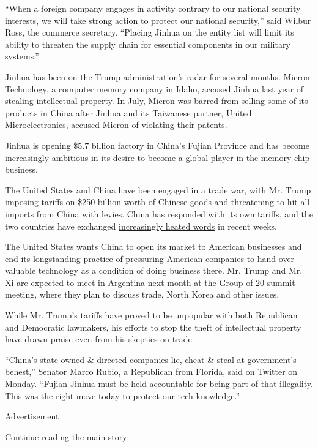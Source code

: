 ``When a foreign company engages in activity contrary to our national
security interests, we will take strong action to protect our national
security,'' said Wilbur Ross, the commerce secretary. ``Placing Jinhua
on the entity list will limit its ability to threaten the supply chain
for essential components in our military systems.''

Jinhua has been on the
\href{https://www.nytimes.com/2018/06/22/technology/china-micron-chips-theft.html}{Trump
administration's radar} for several months. Micron Technology, a
computer memory company in Idaho, accused Jinhua last year of stealing
intellectual property. In July, Micron was barred from selling some of
its products in China after Jinhua and its Taiwanese partner, United
Microelectronics, accused Micron of violating their patents.

Jinhua is opening \$5.7 billion factory in China's Fujian Province and
has become increasingly ambitious in its desire to become a global
player in the memory chip business.

The United States and China have been engaged in a trade war, with Mr.
Trump imposing tariffs on \$250 billion worth of Chinese goods and
threatening to hit all imports from China with levies. China has
responded with its own tariffs, and the two countries have exchanged
\href{https://www.nytimes.com/2018/09/27/world/asia/china-trump-election-meddling.html}{increasingly
heated words} in recent weeks.

The United States wants China to open its market to American businesses
and end its longstanding practice of pressuring American companies to
hand over valuable technology as a condition of doing business there.
Mr. Trump and Mr. Xi are expected to meet in Argentina next month at the
Group of 20 summit meeting, where they plan to discuss trade, North
Korea and other issues.

While Mr. Trump's tariffs have proved to be unpopular with both
Republican and Democratic lawmakers, his efforts to stop the theft of
intellectual property have drawn praise even from his skeptics on trade.

``China's state-owned \& directed companies lie, cheat \& steal at
government's behest,'' Senator Marco Rubio, a Republican from Florida,
said on Twitter on Monday. ``Fujian Jinhua must be held accountable for
being part of that illegality. This was the right move today to protect
our tech knowledge.''

Advertisement

\protect\hyperlink{after-bottom}{Continue reading the main story}

